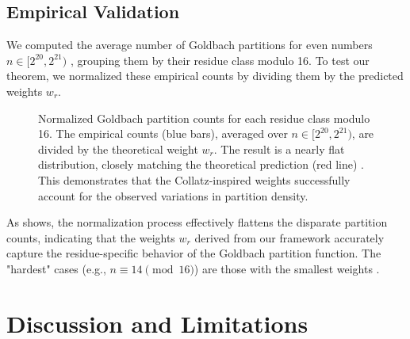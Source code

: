 \documentclass[12pt]{article}
\begin{document}
	\subsection{Empirical Validation}
	
	We computed the average number of Goldbach partitions for even numbers $n \in [2^{20}, 2^{21})$ , grouping them by their residue class modulo 16. To test our theorem, we normalized these empirical counts by dividing them by the predicted weights $w_r$.
	
	\begin{figure}[h!]
		\centering
		\caption{Normalized Goldbach partition counts for each residue class modulo 16. The empirical counts (blue bars), averaged over $n \in [2^{20}, 2^{21})$, are divided by the theoretical weight $w_r$. The result is a nearly flat distribution, closely matching the theoretical prediction (red line) . This demonstrates that the Collatz-inspired weights successfully account for the observed variations in partition density.}
		\label{fig:weighted_counts}
	\end{figure}
	
	As  shows, the normalization process effectively flattens the disparate partition counts, indicating that the weights $w_r$ derived from our framework accurately capture the residue-specific behavior of the Goldbach partition function. The "hardest" cases (e.g., $n \equiv 14 \pmod{16}$) are those with the smallest weights .
	
	\section{Discussion and Limitations}
\end{document}
